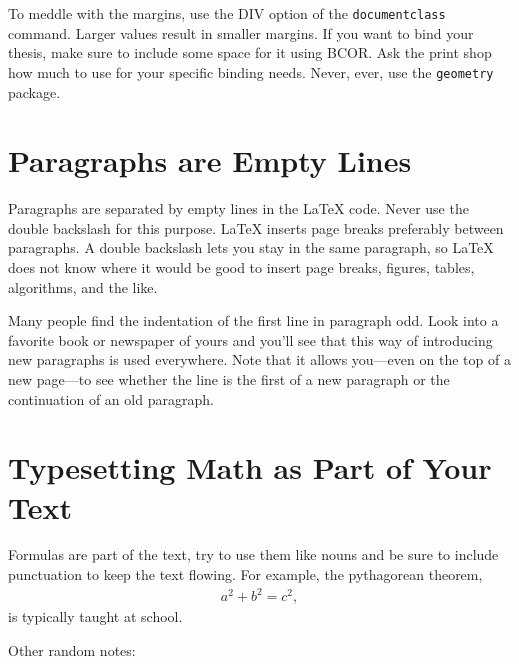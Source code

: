 \documentclass[{{cookiecutter.project_slug}}.tex]{subfiles}
\begin{document}
    To   meddle  with   the   margins,   use  the   DIV   option  of   the 
    \verb+documentclass+  command.    Larger  values  result   in  smaller 
    margins.  If you  want to bind your thesis, make  sure to include some 
    space for  it using BCOR\@.   Ask the print shop  how much to  use for 
    your  specific binding  needs.  Never,  ever, use  the \verb+geometry+ 
    package.                                                               

    \section{Paragraphs are Empty Lines}
    \label{sec:paras}

    Paragraphs are separated  by empty lines in the  \LaTeX{} code.  Never 
    use  the double  backslash for  this purpose.   \LaTeX{} inserts  page 
    breaks  preferably between  paragraphs.  A  double backslash  lets you 
    stay in the  same paragraph, so \LaTeX{} does not  know where it would 
    be good  to insert page  breaks, figures, tables, algorithms,  and the 
    like.                                                                  

    Many  people find  the  indentation  of the  first  line in  paragraph 
    odd.  Look into  a favorite book or newspaper of  yours and you'll see 
    that this way of introducing  new paragraphs is used everywhere.  Note 
    that it  allows you---even on the  top of a new  page---to see whether 
    the line is the first of a new paragraph or the continuation of an old 
    paragraph.                                                             

    \section{Typesetting Math as Part of Your Text}

    Formulas are part of the text, try  to use them like nouns and be sure 
    to include  punctuation to  keep the text  flowing.  For  example, the 
    pythagorean theorem,                                                   
    \begin{align}
        a^2 + b^2 = c^2,
    \end{align}
    is typically taught at school.

    Other random notes:
\end{document}
